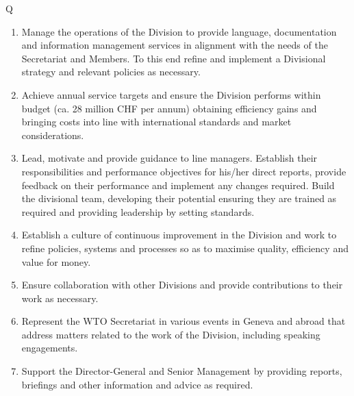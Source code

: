 \documentclass[output=paper]{langsci/langscibook}
\begin{document}
\begin{table}
\footnotesize
\begin{tabularx}{\textwidth}{Q}
 \lsptoprule
 \parbox{.9\textwidth}{

\begin{enumerate}
\item  Manage the operations of the Division to provide language, documentation and information management services in alignment with the needs of the Secretariat and Members. To this end refine and implement a Divisional strategy and relevant policies as necessary.\\ 
\item  Achieve annual service targets and ensure the Division performs within budget (ca. 28 million CHF per annum) obtaining efficiency gains and bringing costs into line with international standards and market considerations.\\ 
\item  Lead, motivate and provide guidance to line managers. Establish their responsibilities and performance objectives for his/her direct reports, provide feedback on their performance and implement any changes required. Build the divisional team, developing their potential ensuring they are trained as required and providing leadership by setting standards.\\ 
\item  Establish a culture of continuous improvement in the Division and work to refine policies, systems and processes so as to maximise quality, efficiency and value for money. \\ 
\item  Ensure collaboration with other Divisions and provide contributions to their work as necessary. \\ 
\item  Represent the WTO Secretariat in various events in Geneva and abroad that address matters related to the work of the Division, including speaking engagements.\\ 
\item  Support the Director-General and Senior Management by providing reports, briefings and other information and advice as required.
\end{enumerate}
}\\
\lspbottomrule
\end{tabularx} 
\caption{Duties of senior ITSM in representative vacancy notice}
\label{tab:prieto:3}
\end{table}
\end{document}
